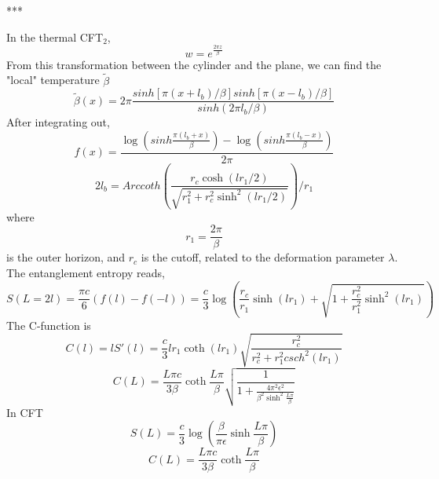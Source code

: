 \documentclass[11pt,a4paper]{article}
\begin{document}
	***
	
	In the thermal CFT$_2$,
	\begin{equation}
	w=e^{\frac{2\pi z}{\beta}}
	\end{equation}
	From this transformation between the cylinder and the plane, we can find the "local" temperature $\tilde{\beta}$
	\begin{equation}
	\tilde{\beta}(x)=2\pi\frac{sinh[\pi(x+l_b)/\beta]sinh[\pi(x-l_b)/\beta]}{sinh(2\pi l_b/\beta)}
	\end{equation}
	After integrating out,
	\begin{equation}
	f(x)=\frac{\log(sinh\frac{\pi(l_b+x)}{\beta})-\log(sinh\frac{\pi(l_b-x)}{\beta})}{2\pi}
	\end{equation}
	\begin{equation}
	2l_b=Arccoth(\frac{r_c\cosh(lr_1/2)}{\sqrt{r_1^2+r_c^2\sinh^2(lr_1/2)}})/r_1
	\end{equation}
	where
	\begin{equation}
	r_1=\frac{2\pi}{\beta}
	\end{equation}
	is the outer horizon, and $r_c$ is the cutoff, related to the deformation parameter $\lambda$. The entanglement entropy reads,
	\begin{equation}
	S(L=2l)=\frac{\pi c}{6}(f(l)-f(-l))=\frac{c}{3}\log(\frac{r_c}{r_1}\sinh(l r_1)+\sqrt{1+\frac{r_c^2}{r_1^2}\sinh^2(l r_1)})
	\end{equation}
	The C-function is
	\begin{equation}
	C(l)=lS'(l)=\frac{c}{3}lr_1\coth(lr_1)\sqrt{\frac{r_c^2}{r_c^2+r_1^2csch^2(l r_1)}}
	\end{equation}
	\begin{equation}
	C(L)=\frac{L\pi c}{3\beta}\coth\frac{L\pi}{\beta}\sqrt{\frac{1}{1+\frac{4\pi^2\epsilon^2}{\beta^2\sinh^2\frac{L\pi}{\beta}}}}
	\end{equation}
	In CFT
	\begin{equation}
	S(L)=\frac{c}{3}\log(\frac{\beta}{\pi \epsilon}\sinh\frac{L\pi}{\beta})
	\end{equation}
	\begin{equation}C(L)=\frac{L\pi c}{3\beta}\coth\frac{L\pi}{\beta}
	\end{equation}
	
\end{document}
